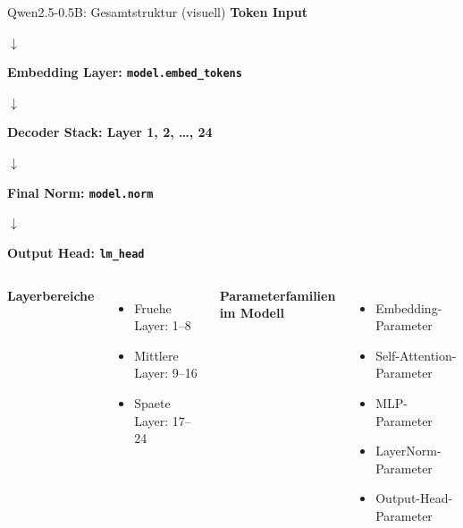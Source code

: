 \documentclass[aspectratio=169,11pt]{beamer}
\begin{document}
\begin{frame}{Qwen2.5-0.5B: Gesamtstruktur (visuell)}
\centering
\small
\textbf{Token Input}

\vspace{0.25em}
$\downarrow$

\textbf{Embedding Layer: \texttt{model.embed\_tokens}}

\vspace{0.25em}
$\downarrow$

\textbf{Decoder Stack: Layer 1, 2, \dots, 24}

\vspace{0.25em}
$\downarrow$

\textbf{Final Norm: \texttt{model.norm}}

\vspace{0.25em}
$\downarrow$

\textbf{Output Head: \texttt{lm\_head}}

\vspace{0.8em}
\begin{columns}[T]
\textbf{Layerbereiche}
\begin{itemize}
  \item Fruehe Layer: 1--8
  \item Mittlere Layer: 9--16
  \item Spaete Layer: 17--24
\end{itemize}

\textbf{Parameterfamilien im Modell}
\begin{itemize}
  \item Embedding-Parameter
  \item Self-Attention-Parameter
  \item MLP-Parameter
  \item LayerNorm-Parameter
  \item Output-Head-Parameter
\end{itemize}
\end{columns}
\end{frame}
\end{document}
